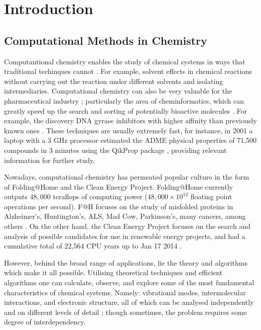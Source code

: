 \chapter{Introduction}\label{c:i}
%
\section{Computational Methods in Chemistry}
%
Computantional chemistry enables the study of chemical systems in ways that traditional techinques cannot \cite{book1}. For example, solvent effects in chemical reactions \cite{ap1} without carrying out the reaction under different solvents and isolating intermediaries. Computational chemistry can also be very valuable for the pharmaceutical industry \cite{pharm7}; particularly the area of cheminformatics, which can greatly speed up the search and sorting of potentially bioactive molecules \cite{pharm2,pharm3}. For example, the discovery DNA gyrase inhibitors with higher affinity than previously known ones \cite{pharm4,pharm5,pharm6}. These techniques are usually extremely fast, for instance, in 2001 a laptop with a 3 GHz processor estimated the ADME \cite{inf} physical properties of 71,500 compounds in 3 minutes using the QikProp package \cite{pharm1}, providing relevant information for further study.

Nowadays, computational chemistry has permeated popular culture in the form of Folding@Home and the Clean Energy Project. Folding@Home currently outputs $48,000$ teraflops of computing power ($ 48,000 \times 10^{12}$ floating point operations per second). F@H focuses on the study of misfolded proteins in Alzheimer's, Huntington's, ALS, Mad Cow, Parkinson's, many cancers, among others \cite{f@h}. On the other hand, the Clean Energy Project focuses on the search and analysis of possible candidates for use in renewable energy projects, and had a cumulative total of 22,564 CPU years up to Jan 17 2014 \cite{cep}.

However, behind the broad range of applications, lie the theory and algorithms which make it all possible. Utilising theoretical techniques and efficient algorithms one can calculate, observe, and explore some of the most fundamental characteristics of chemical systems. Namely: vibrational modes, intermolecular interactions, and electronic structure, all of which can be analysed independently and on different levels of detail \cite{book2}; though sometimes, the problem requires some degree of interdependency.

